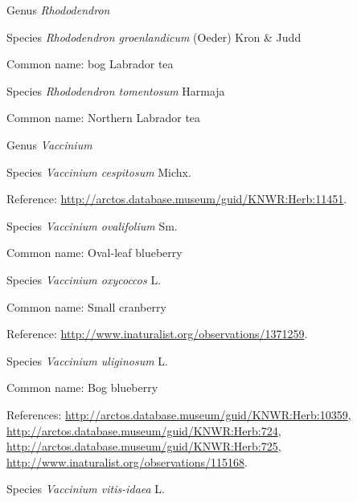 \documentclass[9pt, article]{memoir}
\begin{document}
\begin{multicols}{2}
\vspace{6pt}\noindent\hspace{30pt}Genus \textit{Rhododendron}


\vspace{6pt}\noindent\hspace{36pt}Species \textit{Rhododendron groenlandicum} (Oeder) Kron \& Judd


Common name: bog Labrador tea

\vspace{6pt}\noindent\hspace{36pt}Species \textit{Rhododendron tomentosum} Harmaja


Common name: Northern Labrador tea

\vspace{6pt}\noindent\hspace{30pt}Genus \textit{Vaccinium}


\vspace{6pt}\noindent\hspace{36pt}Species \textit{Vaccinium cespitosum} Michx.


Reference: 
\url{http://arctos.database.museum/guid/KNWR:Herb:11451}.

\vspace{6pt}\noindent\hspace{36pt}Species \textit{Vaccinium ovalifolium} Sm.


Common name: Oval-leaf blueberry

\vspace{6pt}\noindent\hspace{36pt}Species \textit{Vaccinium oxycoccos} L.


Common name: Small cranberry

Reference: 
\url{http://www.inaturalist.org/observations/1371259}.

\vspace{6pt}\noindent\hspace{36pt}Species \textit{Vaccinium uliginosum} L.


Common name: Bog blueberry

References: 
\url{http://arctos.database.museum/guid/KNWR:Herb:10359}, 
\url{http://arctos.database.museum/guid/KNWR:Herb:724}, 
\url{http://arctos.database.museum/guid/KNWR:Herb:725}, 
\url{http://www.inaturalist.org/observations/115168}.

\vspace{6pt}\noindent\hspace{36pt}Species \textit{Vaccinium vitis-idaea} L.



\end{multicols}
\end{document}
